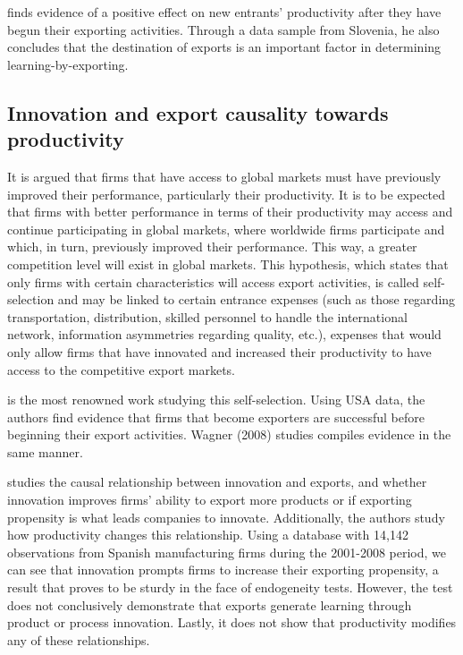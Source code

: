 \cite{DeLoecker2007} finds evidence of a positive effect on new entrants' productivity after they have begun their exporting activities. Through a data sample from Slovenia, he also concludes that the destination of exports is an important factor in determining learning-by-exporting.

\subsection{Innovation and export causality towards productivity}
It is argued that firms that have access to global markets must have previously improved their performance, particularly their productivity. It is to be expected that firms with better performance in terms of their productivity may access and continue participating in global markets, where worldwide firms participate and which, in turn, previously improved their performance. This way, a greater competition level will exist in global markets. This hypothesis, which states that only firms with certain characteristics will access export activities, is called self-selection and may be linked to certain entrance expenses (such as those regarding transportation, distribution, skilled personnel to handle the international network, information asymmetries regarding quality, etc.), expenses that would only allow firms that have innovated and increased their productivity to have access to the competitive export markets.

\cite{BernardJensen1999} is the most renowned work studying this self-selection. Using USA data, the authors find evidence that firms that become exporters are successful before beginning their export activities. Wagner (2008) studies compiles evidence in the same manner.

\cite{MonrealPerez2012} studies the causal relationship between innovation and exports, and whether innovation improves firms' ability to export more products or if exporting propensity is what leads companies to innovate. Additionally, the authors study how productivity changes this relationship. Using a database with 14,142 observations from Spanish manufacturing firms during the 2001-2008 period, we can see that innovation prompts firms to increase their exporting propensity, a result that proves to be sturdy in the face of endogeneity tests. However, the test does not conclusively demonstrate that exports generate learning through product or process innovation. Lastly, it does not show that productivity modifies any of these relationships.

